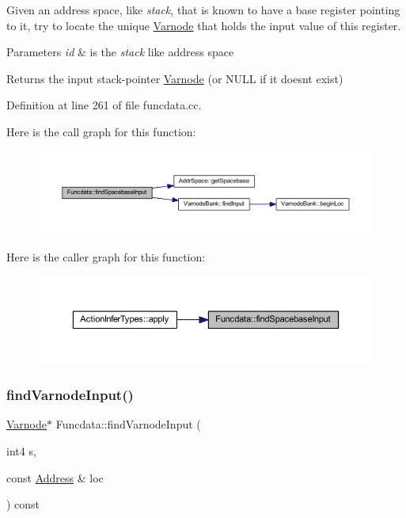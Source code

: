 Given an address space, like {\itshape stack}, that is known to have a base register pointing to it, try to locate the unique \mbox{\hyperlink{class_varnode}{Varnode}} that holds the input value of this register. 
\begin{DoxyParams}{Parameters}
{\em id} & is the {\itshape stack} like address space \\
\hline
\end{DoxyParams}
\begin{DoxyReturn}{Returns}
the input stack-\/pointer \mbox{\hyperlink{class_varnode}{Varnode}} (or N\+U\+LL if it doesn\textquotesingle{}t exist) 
\end{DoxyReturn}


Definition at line 261 of file funcdata.\+cc.

Here is the call graph for this function\+:
\nopagebreak
\begin{figure}[H]
\begin{center}
\leavevmode
\includegraphics[width=350pt]{class_funcdata_a1eee1ea3fa8e72d17549a936567c97bf_cgraph}
\end{center}
\end{figure}
Here is the caller graph for this function\+:
\nopagebreak
\begin{figure}[H]
\begin{center}
\leavevmode
\includegraphics[width=350pt]{class_funcdata_a1eee1ea3fa8e72d17549a936567c97bf_icgraph}
\end{center}
\end{figure}
\mbox{\label{class_funcdata_a718cc133e6ade757ee532f0d704c04d4}} 
\subsubsection{\texorpdfstring{findVarnodeInput()}{findVarnodeInput()}}
{\footnotesize\ttfamily \mbox{\hyperlink{class_varnode}{Varnode}}$\ast$ Funcdata\+::find\+Varnode\+Input (\begin{DoxyParamCaption}\item[{int4}]{s,  }\item[{const \mbox{\hyperlink{class_address}{Address}} \&}]{loc }\end{DoxyParamCaption}) const\hspace{0.3cm}{\ttfamily [inline]}}



